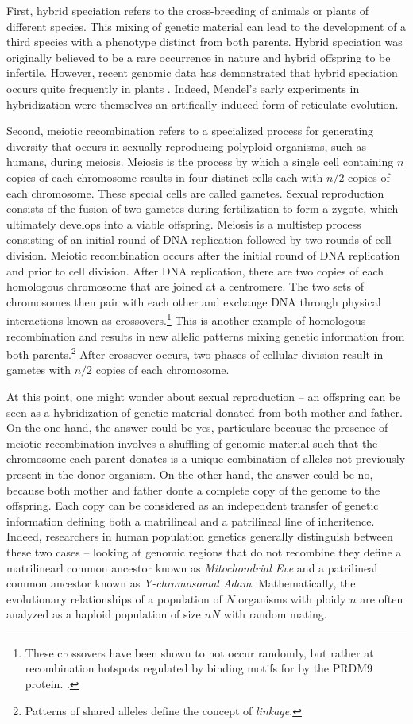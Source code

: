 First, hybrid speciation refers to the cross-breeding of animals or plants of different species.
This mixing of genetic material can lead to the development of a third species with a phenotype distinct from both parents.
Hybrid speciation was originally believed to be a rare occurrence in nature and hybrid offspring to be infertile.
However, recent genomic data has demonstrated that hybrid speciation occurs quite frequently in plants \cite{Arnold:1996,Arnold:2007vq}.
Indeed, Mendel's early experiments in hybridization were themselves an artifically induced form of reticulate evolution.

Second, meiotic recombination refers to a specialized process for generating diversity that occurs in sexually-reproducing polyploid organisms, such as humans, during meiosis.
Meiosis is the process by which a single cell containing $n$ copies of each chromosome results in four distinct cells each with $n/2$ copies of each chromosome.
These special cells are called gametes.
Sexual reproduction consists of the fusion of two gametes during fertilization to form a zygote, which ultimately develops into a viable offspring.
Meiosis is a multistep process consisting of an initial round of DNA replication followed by two rounds of cell division.
Meiotic recombination occurs after the initial round of DNA replication and prior to cell division.
After DNA replication, there are two copies of each homologous chromosome that are joined at a centromere.
The two sets of chromosomes then pair with each other and exchange DNA through physical interactions known as crossovers.\footnote{These crossovers have been shown to not occur randomly, but rather at recombination hotspots regulated by binding motifs for by the PRDM9 protein. .}
This is another example of homologous recombination and results in new allelic patterns mixing genetic information from both parents.\footnote{Patterns of shared alleles define the concept of \emph{linkage}.}
After crossover occurs, two phases of cellular division result in gametes with $n/2$ copies of each chromosome.

At this point, one might wonder about sexual reproduction -- an offspring can be seen as a hybridization of genetic material donated from both mother and father.
On the one hand, the answer could be yes, particulare because the presence of meiotic recombination involves a shuffling of genomic material such that the chromosome each parent donates is a unique combination of alleles not previously present in the donor organism.
On the other hand, the answer could be no, because both mother and father donte a complete copy of the genome to the offspring.
Each copy can be considered as an independent transfer of genetic information defining both a matrilineal and a patrilineal line of inheritence.
Indeed, researchers in human population genetics generally distinguish between these two cases -- looking at genomic regions that do not recombine they define a matrilinearl common ancestor known as \emph{Mitochondrial Eve} and a patrilineal common ancestor known as \emph{Y-chromosomal Adam}.
Mathematically, the evolutionary relationships of a population of $N$ organisms with ploidy $n$ are often analyzed as a haploid population of size $nN$ with random mating.

